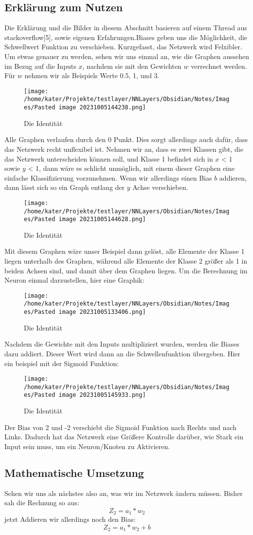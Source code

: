 \documentclass[12pt]{article}
\begin{document}
\subsection{ Erklärung zum Nutzen}Die Erklärung und die Bilder in diesem Abschnitt basieren auf einem Thread aus stackoverflow[5], sowie eigenen Erfahrungen.Biases geben uns die Möglichkeit, die Schwellwert Funktion zu verschieben. Kurzgefasst, das Netzwerk wird Felxibler. 
Um etwas genauer zu werden, sehen wir uns einmal an, wie die Graphen aussehen im Bezug auf die Inputs $x$, nachdem sie mit den Gewichten $w$ verrechnet werden. Für $w$ nehmen wir als Beispiels Werte 0.5, 1, und 3.\begin{figure}[H]
\centering
\texttt{[image: /home/kater/Projekte/testlayer/NNLayers/Obsidian/Notes/Images/Pasted image 20231005144238.png]}
\caption{Die Identität}
\label{Was kommt hier rein?}\end{figure}Alle Graphen verlaufen durch den 0 Punkt. Dies sorgt allerdings auch dafür, dass das Netzwerk recht unflexibel ist. Nehmen wir an, dass es zwei Klassen gibt, die das Netzwerk unterscheiden können soll, und Klasse 1 befindet sich in $x$ < 1 sowie $y$ < 1, dann wäre es schlicht unmöglich, mit einem dieser Graphen eine einfache Klassifizierung vorzunehmen. Wenn wir allerdings einen Bias $b$ addieren, dann lässt sich so ein Graph entlang der $y$ Achse verschieben.\begin{figure}[H]
\centering
\texttt{[image: /home/kater/Projekte/testlayer/NNLayers/Obsidian/Notes/Images/Pasted image 20231005144628.png]}
\caption{Die Identität}
\label{Was kommt hier rein?}\end{figure}Mit diesem Graphen wäre unser Beispiel dann gelöst, alle Elemente der Klasse 1 liegen unterhalb des Graphen, während alle Elemente der Klasse 2 größer als 1 in beiden Achsen sind, und damit über dem Graphen liegen.
Um die Berechnung im Neuron einmal darzustellen, hier eine Graphik:\begin{figure}[H]
\centering
\texttt{[image: /home/kater/Projekte/testlayer/NNLayers/Obsidian/Notes/Images/Pasted image 20231005133406.png]}
\caption{Die Identität}
\label{Was kommt hier rein?}\end{figure}Nachdem die Gewichte mit den Inputs multipliziert wurden, werden die Biases dazu addiert. Dieser Wert wird dann an die Schwellenfunktion übergeben. Hier ein beispiel mit der Sigmoid Funktion:\begin{figure}[H]
\centering
\texttt{[image: /home/kater/Projekte/testlayer/NNLayers/Obsidian/Notes/Images/Pasted image 20231005145933.png]}
\caption{Die Identität}
\label{Was kommt hier rein?}\end{figure}Der Bias von 2 und -2 verschiebt die Sigmoid Funktion nach Rechts und nach Links. Dadurch hat das Netzwerk eine Größere Kontrolle darüber, wie Stark ein Input sein muss, um ein Neuron/Knoten zu Aktivieren.\subsection{ Mathematische Umsetzung}Sehen wir uns als nächstes also an, was wir im Netzwerk ändern müssen. Bisher sah die Rechnung so aus:$$Z_2 = a_1 * w_2$$jetzt Addieren wir allerdings noch den Bias: $$Z_2 = a_1 * w_2 + b$$
\end{document}
